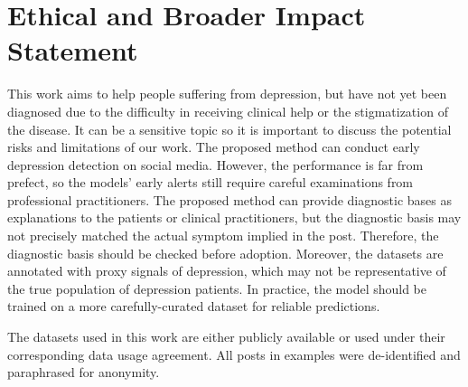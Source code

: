 \section{Ethical and Broader Impact Statement}

This work aims to help people suffering from depression, but have not yet been diagnosed due to the difficulty in receiving clinical help or the stigmatization of the disease. It can be a sensitive topic so it is important to discuss the potential risks and limitations of our work. The proposed method can conduct early depression detection on social media. However, the performance is far from prefect, so the models' early alerts still require careful examinations from professional practitioners. The proposed method can provide diagnostic bases as explanations to the patients or clinical practitioners, but the diagnostic basis may not precisely matched the actual symptom implied in the post. Therefore, the diagnostic basis should be checked before adoption. Moreover, the datasets are annotated with proxy signals of depression, which may not be representative of the true population of depression patients. In practice, the model should be trained on a more carefully-curated dataset for reliable predictions.

The datasets used in this work are either publicly available or used under their corresponding data usage agreement. All posts in examples were de-identified and paraphrased for anonymity.